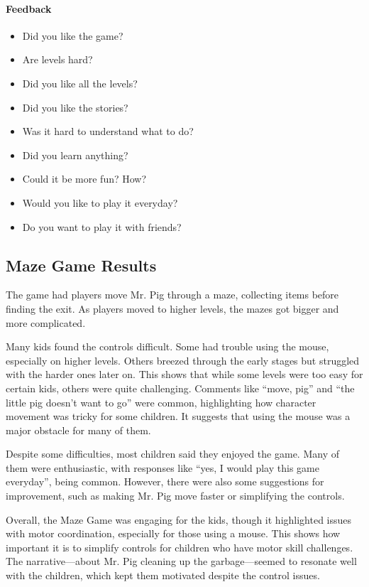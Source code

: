 \paragraph{Feedback}
\begin{itemize}
    \item Did you like the game?
    \item Are levels hard?
    \item Did you like all the levels?
    \item Did you like the stories?
    \item Was it hard to understand what to do?
    \item Did you learn anything?
    \item Could it be more fun? How?
    \item Would you like to play it everyday?
    \item Do you want to play it with friends?
\end{itemize}

\newpage
\subsection{Maze Game Results}
The game had players move Mr. Pig through a maze, collecting items before finding the exit. As players moved to higher levels, the mazes got bigger and more complicated.

Many kids found the controls difficult. Some had trouble using the mouse, especially on higher levels. Others breezed through the early stages but struggled with the harder ones later on. This shows that while some levels were too easy for certain kids, others were quite challenging. Comments like ``move, pig'' and ``the little pig doesn’t want to go'' were common, highlighting how character movement was tricky for some children. It suggests that using the mouse was a major obstacle for many of them.

Despite some difficulties, most children said they enjoyed the game. Many of them were enthusiastic, with responses like ``yes, I would play this game everyday'', being common. However, there were also some suggestions for improvement, such as making Mr. Pig move faster or simplifying the controls.

Overall, the Maze Game was engaging for the kids, though it highlighted issues with motor coordination, especially for those using a mouse. This shows how important it is to simplify controls for children who have motor skill challenges. The narrative—about Mr. Pig cleaning up the garbage—seemed to resonate well with the children, which kept them motivated despite the control issues.

